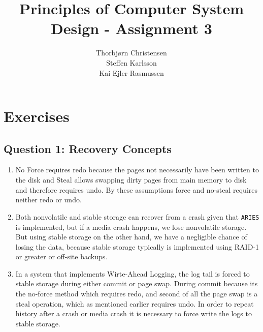\documentclass[10pt,a4paper]{article}
\author{Thorbjørn Christensen \\
Steffen Karlsson \\
Kai Ejler Rasmussen}
\title{Principles of Computer System Design - Assignment 3}
\begin{document}
\maketitle

\section*{Exercises}
\subsection*{Question 1: Recovery Concepts}
\begin{enumerate}
	\item No Force requires redo because the pages not necessarily have been written to the disk and Steal allows swapping dirty pages from main memory to disk and therefore requires undo. By these assumptions force and no-steal requires neither redo or undo.
	\item Both nonvolatile and stable storage can recover from a crash given that \texttt{ARIES} is implemented, but if a media crash happens, we lose nonvolatile storage. But using stable storage on the other hand, we have a negligible chance of losing the data, because stable storage typically is implemented using RAID-1 or greater or off-site backups.
	\item In a system that implements Wirte-Ahead Logging, the log tail is forced to stable storage during either commit or page swap. During commit because its the no-force method which requires redo, and second of all the page swap is a steal operation, which as mentioned earlier requires undo. In order to repeat history after a crash or media crash it is necessary to force write the logs to stable storage.
\end{enumerate}
\end{document}
